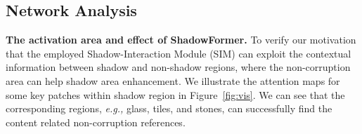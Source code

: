 \documentclass[letterpaper]{article} \usepackage{aaai23}  \usepackage{times}  \usepackage{helvet}  \usepackage{courier}  \usepackage[hyphens]{url}  \usepackage{graphicx} \urlstyle{rm} \def\UrlFont{\rm}  \usepackage{natbib}  \usepackage{caption} \frenchspacing  \setlength{\pdfpagewidth}{8.5in} \setlength{\pdfpageheight}{11in} \usepackage{algorithm}
\newcommand{\eg}{\textit{e.g., }}
\begin{document}
\begin{table}[!t]
\centering
\footnotesize
\setlength{\tabcolsep}{0.3em}
\renewcommand{\arraystretch}{0.7}
\caption{Quantitative evaluation results on ISTD dataset over Ours-Large model against its variants without the CA, without the SIA, and without spatial attention (SA).}
\label{tab:ablation}
\end{table}





\subsection{Network Analysis}
\noindent\textbf{The activation area and effect of ShadowFormer.}
To verify our motivation that the employed Shadow-Interaction Module (SIM) can exploit the contextual information between shadow and non-shadow regions, where the non-corruption area can help shadow area enhancement.
We illustrate the attention maps for some key patches within shadow region in Figure~\ref{fig:vis}.
We can see that the corresponding regions, \eg glass, tiles, and stones, can successfully find the content related non-corruption references.
\end{document}
